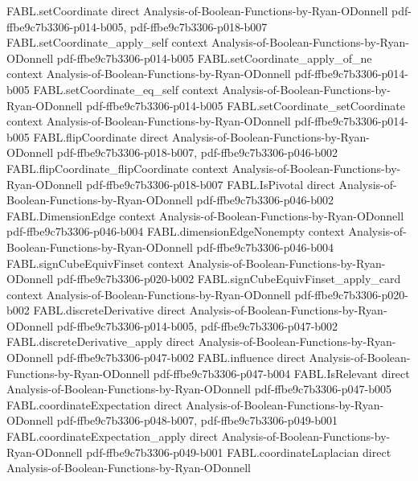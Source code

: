\begin{theorem}
  {FABL.setCoordinate}
  {direct}
  {Analysis-of-Boolean-Functions-by-Ryan-ODonnell}
  {pdf-ffbe9c7b3306-p014-b005,
    pdf-ffbe9c7b3306-p018-b007}
\proofstep
  {FABL.setCoordinate_apply_self}
  {context}
  {Analysis-of-Boolean-Functions-by-Ryan-ODonnell}
  {pdf-ffbe9c7b3306-p014-b005}
\proofstep
  {FABL.setCoordinate_apply_of_ne}
  {context}
  {Analysis-of-Boolean-Functions-by-Ryan-ODonnell}
  {pdf-ffbe9c7b3306-p014-b005}
\proofstep
  {FABL.setCoordinate_eq_self}
  {context}
  {Analysis-of-Boolean-Functions-by-Ryan-ODonnell}
  {pdf-ffbe9c7b3306-p014-b005}
\proofstep
  {FABL.setCoordinate_setCoordinate}
  {context}
  {Analysis-of-Boolean-Functions-by-Ryan-ODonnell}
  {pdf-ffbe9c7b3306-p014-b005}
\proofstep
  {FABL.flipCoordinate}
  {direct}
  {Analysis-of-Boolean-Functions-by-Ryan-ODonnell}
  {pdf-ffbe9c7b3306-p018-b007,
    pdf-ffbe9c7b3306-p046-b002}
\proofstep
  {FABL.flipCoordinate_flipCoordinate}
  {context}
  {Analysis-of-Boolean-Functions-by-Ryan-ODonnell}
  {pdf-ffbe9c7b3306-p018-b007}
\proofstep
  {FABL.IsPivotal}
  {direct}
  {Analysis-of-Boolean-Functions-by-Ryan-ODonnell}
  {pdf-ffbe9c7b3306-p046-b002}
\proofstep
  {FABL.DimensionEdge}
  {context}
  {Analysis-of-Boolean-Functions-by-Ryan-ODonnell}
  {pdf-ffbe9c7b3306-p046-b004}
\proofstep
  {FABL.dimensionEdgeNonempty}
  {context}
  {Analysis-of-Boolean-Functions-by-Ryan-ODonnell}
  {pdf-ffbe9c7b3306-p046-b004}
\proofstep
  {FABL.signCubeEquivFinset}
  {context}
  {Analysis-of-Boolean-Functions-by-Ryan-ODonnell}
  {pdf-ffbe9c7b3306-p020-b002}
\proofstep
  {FABL.signCubeEquivFinset_apply_card}
  {context}
  {Analysis-of-Boolean-Functions-by-Ryan-ODonnell}
  {pdf-ffbe9c7b3306-p020-b002}
\proofstep
  {FABL.discreteDerivative}
  {direct}
  {Analysis-of-Boolean-Functions-by-Ryan-ODonnell}
  {pdf-ffbe9c7b3306-p014-b005,
    pdf-ffbe9c7b3306-p047-b002}
\proofstep
  {FABL.discreteDerivative_apply}
  {direct}
  {Analysis-of-Boolean-Functions-by-Ryan-ODonnell}
  {pdf-ffbe9c7b3306-p047-b002}
\proofstep
  {FABL.influence}
  {direct}
  {Analysis-of-Boolean-Functions-by-Ryan-ODonnell}
  {pdf-ffbe9c7b3306-p047-b004}
\proofstep
  {FABL.IsRelevant}
  {direct}
  {Analysis-of-Boolean-Functions-by-Ryan-ODonnell}
  {pdf-ffbe9c7b3306-p047-b005}
\proofstep
  {FABL.coordinateExpectation}
  {direct}
  {Analysis-of-Boolean-Functions-by-Ryan-ODonnell}
  {pdf-ffbe9c7b3306-p048-b007,
    pdf-ffbe9c7b3306-p049-b001}
\proofstep
  {FABL.coordinateExpectation_apply}
  {direct}
  {Analysis-of-Boolean-Functions-by-Ryan-ODonnell}
  {pdf-ffbe9c7b3306-p049-b001}
\proofstep
  {FABL.coordinateLaplacian}
  {direct}
  {Analysis-of-Boolean-Functions-by-Ryan-ODonnell}

\end{theorem}
